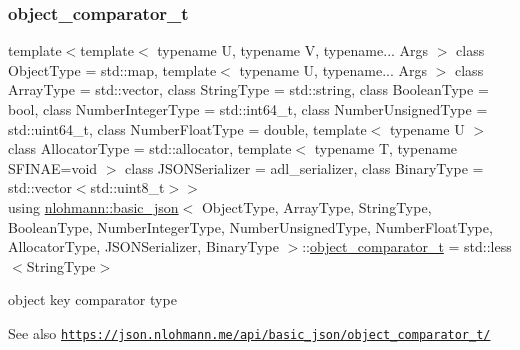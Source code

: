 \subsubsection{\texorpdfstring{object\+\_\+comparator\+\_\+t}{object\_comparator\_t}}
{\footnotesize\ttfamily template$<$template$<$ typename U, typename V, typename... Args $>$ class Object\+Type = std\+::map, template$<$ typename U, typename... Args $>$ class Array\+Type = std\+::vector, class String\+Type  = std\+::string, class Boolean\+Type  = bool, class Number\+Integer\+Type  = std\+::int64\+\_\+t, class Number\+Unsigned\+Type  = std\+::uint64\+\_\+t, class Number\+Float\+Type  = double, template$<$ typename U $>$ class Allocator\+Type = std\+::allocator, template$<$ typename T, typename S\+F\+I\+N\+A\+E=void $>$ class J\+S\+O\+N\+Serializer = adl\+\_\+serializer, class Binary\+Type  = std\+::vector$<$std\+::uint8\+\_\+t$>$$>$ \\
using \hyperlink{classnlohmann_1_1basic__json}{nlohmann\+::basic\+\_\+json}$<$ Object\+Type, Array\+Type, String\+Type, Boolean\+Type, Number\+Integer\+Type, Number\+Unsigned\+Type, Number\+Float\+Type, Allocator\+Type, J\+S\+O\+N\+Serializer, Binary\+Type $>$\+::\hyperlink{classnlohmann_1_1basic__json_ac26c2e8d6bcaccde372ceedd81851200}{object\+\_\+comparator\+\_\+t} =  std\+::less$<$String\+Type$>$}



object key comparator type 

\begin{DoxySeeAlso}{See also}
\href{https://json.nlohmann.me/api/basic_json/object_comparator_t/}{\tt https\+://json.\+nlohmann.\+me/api/basic\+\_\+json/object\+\_\+comparator\+\_\+t/} 
\end{DoxySeeAlso}
\mbox{\label{classnlohmann_1_1basic__json_aef3ff5a73597850597d1d40db9edd376}} 

